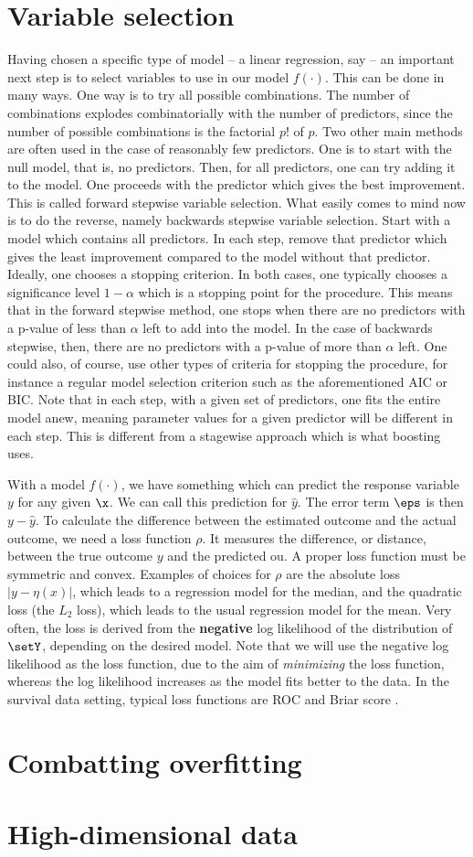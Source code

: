 \section{Variable selection}
Having chosen a specific type of model -- a linear regression, say -- an important next step is to select variables to use in our model $f(\cdot)$. This can be done in many ways. One way is to try all possible combinations. The number of combinations explodes combinatorially with the number of predictors, since the number of possible combinations is the factorial $p!$ of $p$. Two other main methods are often used in the case of reasonably few predictors. One is to start with the null model, that is, no predictors. Then, for all predictors, one can try adding it to the model. One proceeds with the predictor which gives the best improvement. This is called forward stepwise variable selection. What easily comes to mind now is to do the reverse, namely backwards stepwise variable selection. Start with a model which contains all predictors. In each step, remove that predictor which gives the least improvement compared to the model without that predictor. Ideally, one chooses a stopping criterion. In both cases, one typically chooses a significance level $1-\alpha$ which is a stopping point for the procedure. This means that in the forward stepwise method, one stops when there are no predictors with a p-value of less than $\alpha$ left to add into the model. In the case of backwards stepwise, then, there are no predictors with a p-value of more than $\alpha$ left. One could also, of course, use other types of criteria for stopping the procedure, for instance a regular model selection criterion such as the aforementioned AIC or BIC. Note that in each step, with a given set of predictors, one fits the entire model anew, meaning parameter values for a given predictor will be different in each step. This is different from a stagewise approach which is what boosting uses.

With a model $f(\cdot)$, we have something which can predict the response variable $y$ for any given $\x$. We can call this prediction for $\hat{y}$. The error term $\eps$ is then $y-\hat{y}$. To calculate the difference between the estimated outcome and the actual outcome, we need a loss function $\rho$. It measures the difference, or distance, between the true outcome $y$ and the predicted ou. A proper loss function must be symmetric and convex. Examples of choices for $\rho$ are the absolute loss $|y-\eta(x)|$, which leads to a regression model for the median, and the quadratic loss (the $L_2$ loss), which leads to the usual regression model for the mean. Very often, the loss is derived from the \textbf{negative} log likelihood of the distribution of $\setY$, depending on the desired model. Note that we will use the negative log likelihood as the loss function, due to the aim of \textit{minimizing} the loss function, whereas the log likelihood increases as the model fits better to the data. In the survival data setting, typical loss functions are ROC and Briar score \citep{bovelstadborgan}.

\section{Combatting overfitting}

\section{High-dimensional data}